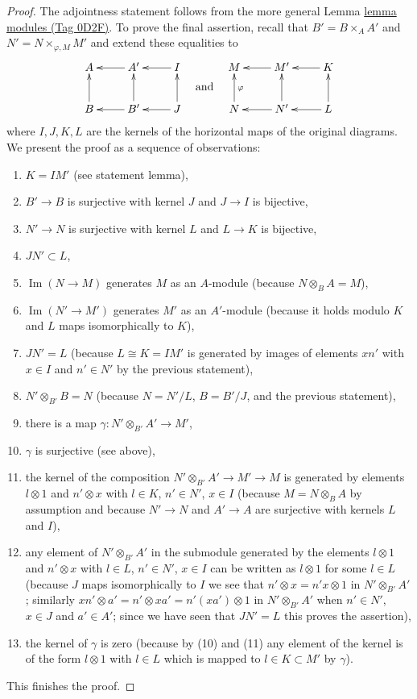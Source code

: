 \documentclass{amsart}
\theoremstyle{plain}
\theoremstyle{definition}
\theoremstyle{remark}
\numberwithin{equation}{subsection}
\def\Im{\mathop{\mathrm{Im}}}
\begin{document}
\begin{proof}
The adjointness statement follows from the more general
Lemma \href{https://stacks.math.columbia.edu/tag/0D2F}{lemma modules (Tag 0D2F)}.
To prove the final assertion, recall that
$B' = B \times_A A'$ and $N' = N \times_{\varphi, M} M'$ and extend
these equalities to 
$$
\vcenter{
\xymatrix{
A & A' \ar[l] & I \ar[l] \\
B \ar[u] & B' \ar[l] \ar[u] & J \ar[l] \ar[u]
}
}
\quad\text{and}\quad
\vcenter{
\xymatrix{
M & M' \ar[l] & K \ar[l] \\
N \ar[u]_\varphi & N' \ar[l] \ar[u] & L \ar[l] \ar[u]
}
}
$$
where $I, J, K, L$ are the kernels of the horizontal maps of the original
diagrams. We present the proof as a sequence of observations:
\begin{enumerate}
\item $K = IM'$ (see statement lemma),
\item $B' \to B$ is surjective with kernel $J$ and $J \to I$ is bijective,
\item $N' \to N$ is surjective with kernel $L$ and $L \to K$ is bijective,
\item $JN' \subset L$,
\item $\Im(N \to M)$ generates $M$ as an $A$-module
(because $N \otimes_B A = M$),
\item $\Im(N' \to M')$ generates $M'$ as an $A'$-module
(because it holds modulo $K$ and $L$ maps isomorphically to $K$),
\item $JN' = L$ (because $L \cong K = I M'$
is generated by images of elements $x n'$ with $x \in I$ and
$n' \in N'$ by the previous statement),
\item $N' \otimes_{B'} B = N$ (because $N = N'/L$, $B = B'/J$, and
the previous statement),
\item there is a map $\gamma : N' \otimes_{B'} A' \to M'$,
\item $\gamma$ is surjective (see above),
\item the kernel of the composition $N' \otimes_{B'} A' \to M' \to M$ 
is generated by elements $l \otimes 1$ and $n' \otimes x$ with
$l \in K$, $n' \in N'$, $x \in I$ (because $M = N \otimes_B A$ by assumption
and because $N' \to N$ and $A' \to A$ are surjective with kernels
$L$ and $I$),
\item any element of $N' \otimes_{B'} A'$ in the submodule generated
by the elements $l \otimes 1$ and $n' \otimes x$ with
$l \in L$, $n' \in N'$, $x \in I$ can be written as $l \otimes 1$
for some $l \in L$ (because $J$ maps isomorphically to $I$ we see
that $n' \otimes x = n'x \otimes 1$ in $N' \otimes_{B'} A'$;
similarly $x n' \otimes a' = n' \otimes xa' = n'(xa') \otimes 1$
in $N' \otimes_{B'} A'$ when $n' \in N'$, $x \in J$ and $a' \in A'$;
since we have seen that $JN' = L$ this proves the assertion),
\item the kernel of $\gamma$ is zero (because by (10) and (11) any element of
the kernel is of the form $l \otimes 1$ with $l \in L$ which
is mapped to $l \in K \subset M'$ by $\gamma$).
\end{enumerate}
This finishes the proof.
\end{proof}
\end{document}
